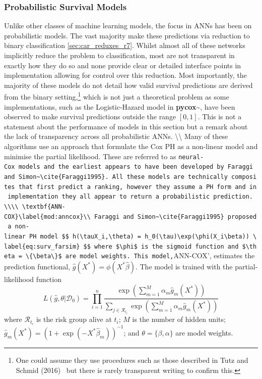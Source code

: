 \documentclass[
  letterpaper,
]{scrbook}
\theoremstyle{plain}
\theoremstyle{definition}
\theoremstyle{remark}
\begin{document}
\subsubsection{Probabilistic Survival Models}

Unlike other classes of machine learning models, the focus in ANNs has
been on probabilistic models. The vast majority make these predictions
via reduction to binary classification \ref{sec:car_reduxes_r7}. Whilst
almost all of these networks implicitly reduce the problem to
classification, most are not transparent in exactly how they do so and
none provide clear or detailed interface points in implementation
allowing for control over this reduction. Most importantly, the majority
of these models do not detail how valid survival predictions are derived
from the binary
setting,\footnote{One could assume they use procedures such as those described in Tutz and Schmid (2016)~\cite{Tutz2016} but there is rarely transparent writing to confirm this.}
which is not just a theoretical problem as some implementations, such as
the Logistic-Hazard model in
\textbf{pycox}\textasciitilde{}\cite{pkgpycox}, have been observed to
make survival predictions outside the range \([0,1]\). This is not a
statement about the performance of models in this section but a remark
about the lack of transparency across all probabilistic ANNs.
\textbackslash\textbackslash{} Many of these algorithms use an approach
that formulate the Cox PH as a non-linear model and minimise the partial
likelihood. These are referred to as
\texttt{neural-Cox\textquotesingle{}\ models\ and\ the\ earliest\ appears\ to\ have\ been\ developed\ by\ Faraggi\ and\ Simon\textasciitilde{}\textbackslash{}cite\{Faraggi1995\}.\ All\ these\ models\ are\ technically\ composites\ that\ first\ predict\ a\ ranking,\ however\ they\ assume\ a\ PH\ form\ and\ in\ implementation\ they\ all\ appear\ to\ return\ a\ probabilistic\ prediction.\ \textbackslash{}\textbackslash{}\textbackslash{}\textbackslash{}\ \textbackslash{}textbf\{ANN-COX\}\textbackslash{}label\{mod:anncox\}\textbackslash{}\textbackslash{}\ Faraggi\ and\ Simon\textasciitilde{}\textbackslash{}cite\{Faraggi1995\}\ proposed\ a\ non-linear\ PH\ model\ \$\$\ h(\textbackslash{}tau\textbar{}X\_i,\textbackslash{}theta)\ =\ h\_0(\textbackslash{}tau)\textbackslash{}exp(\textbackslash{}phi(X\_i\textbackslash{}beta))\ \textbackslash{}label\{eq:surv\_farsim\}\ \$\$\ where\ \$\textbackslash{}phi\$\ is\ the\ sigmoid\ function\ and\ \$\textbackslash{}theta\ =\ \textbackslash{}\{\textbackslash{}beta\textbackslash{}\}\$\ are\ model\ weights.\ This\ model,}ANN-COX',
estimates the prediction functional,
\(\hat{g}(X^*) = \phi(X^*\hat{\beta})\). The model is trained with the
partial-likelihood function \[
L(\hat{g}, \theta|\mathcal{D}_0) = \prod_{i = 1}^n \frac{\exp(\sum^M_{m=1} \alpha_m\hat{g}_m(X^*))}{\sum_{j \in \mathcal{R}_{t_i}} \exp(\sum^M_{m=1} \alpha_m\hat{g}_m(X^*))}
\] where \(\mathcal{R}_{t_i}\) is the risk group alive at \(t_i\); \(M\)
is the number of hidden units;
\(\hat{g}_m(X^*) = (1 + \exp(-X^*\hat{\beta}_m))^{-1}\); and
\(\theta = \{\beta, \alpha\}\) are model weights.
\end{document}
